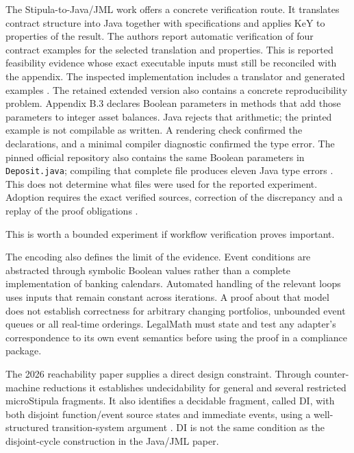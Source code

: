 
The Stipula-to-Java/JML work offers a concrete verification route. It translates
contract structure into Java together with specifications and applies KeY to
properties of the result. The authors report automatic verification of four contract examples for the
selected translation and properties. This is reported feasibility evidence
whose exact executable inputs must still be reconciled with the appendix. The inspected implementation includes a
translator and generated examples \citep[secs.~3--4 and apps.~A--B]{stipulakey2025,stipulakeycode}.
The retained extended version also contains a concrete reproducibility
problem. Appendix B.3 declares Boolean parameters in methods that add
those parameters to integer asset balances. Java rejects that arithmetic;
the printed example is not compilable as written. A rendering check
confirmed the declarations, and a minimal compiler diagnostic confirmed
the type error. The pinned official repository also contains the same
Boolean parameters in \texttt{Deposit.java}; compiling that complete
file produces eleven Java type errors \citep{stipulakeycode}.
This does not determine what files were used for the
reported experiment. Adoption requires the exact verified sources,
correction of the discrepancy and a replay of the proof obligations
\citep[app.~B.3, pp.~31--32]{stipulakey2025}.

This is worth a bounded experiment if workflow verification proves important.

The encoding also defines the limit of the evidence. Event conditions are
abstracted through symbolic Boolean values rather than a complete implementation
of banking calendars. Automated handling of the relevant loops uses inputs that
remain constant across iterations. A proof about that model does not establish
correctness for arbitrary changing portfolios, unbounded event queues or all
real-time orderings. LegalMath must state and test any adapter's correspondence
to its own event semantics before using the proof in a compliance package.

The 2026 reachability paper supplies a direct design constraint. Through
counter-machine reductions it establishes undecidability for general and several
restricted microStipula fragments. It also identifies a decidable fragment,
called DI, with both disjoint function/event source states and immediate events,
using a well-structured transition-system argument
\citep[secs.~2--4]{reachability2026}. DI is not the same condition as the
disjoint-cycle construction in the Java/JML paper.

